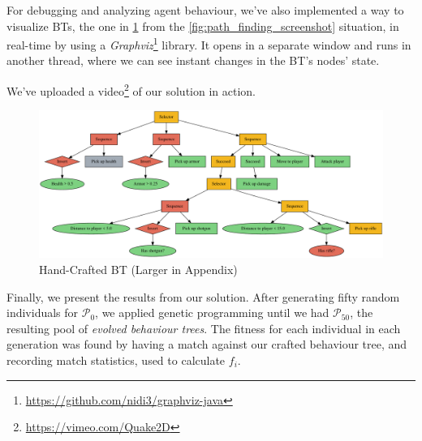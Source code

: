 \documentclass[a4paper, twocolumn]{article}
\begin{document}
        For debugging and analyzing agent behaviour, we've also implemented a way to visualize BTs, the one in \cref{fig:hand_crafted_behaviour_tree} from the \cref{fig:path_finding_screenshot} situation, in real-time by using a \emph{Graphviz}\footnote{\url{https://github.com/nidi3/graphviz-java}} library. It opens in a separate window and runs in another thread, where we can see instant changes in the BT's nodes' state.

        We've uploaded a video\footnote{\url{https://vimeo.com/Quake2D}} of our solution in action.

        \begin{figure}[H]
            \centering
            \includegraphics[width=\linewidth]{share/hand_crafted_behaviour_tree.pdf}
            \caption{Hand-Crafted BT (Larger in Appendix)}
            \label{fig:hand_crafted_behaviour_tree}
        \end{figure}

        Finally, we present the results from our solution. After generating fifty random individuals for \(\mathcal{P}_0\), we applied genetic programming until we had \(\mathcal{P}_{50}\), the resulting pool of \emph{evolved behaviour trees}. The fitness for each individual in each generation was found by having a match against our crafted behaviour tree, and recording match statistics, used to calculate \(f_i\).

        \newpage
\end{document}
